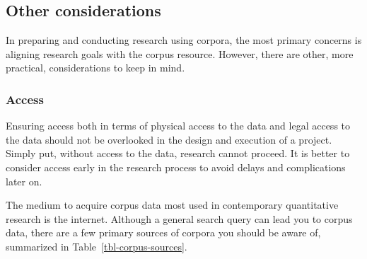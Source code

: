 \documentclass[
  letterpaper,
  DIV=11,
  numbers=noendperiod]{scrreprt}
\theoremstyle{definition}
\theoremstyle{remark}
\begin{document}
\subsection{Other considerations}\label{other-considerations}

In preparing and conducting research using corpora, the most primary
concerns is aligning research goals with the corpus resource. However,
there are other, more practical, considerations to keep in mind.

\subsubsection{Access}\label{access}

Ensuring access both in terms of physical access to the data and legal
access to the data should not be overlooked in the design and execution
of a project. Simply put, without access to the data, research cannot
proceed. It is better to consider access early in the research process
to avoid delays and complications later on.

The medium to acquire corpus data most used in contemporary quantitative
research is the internet. Although a general search query can lead you
to corpus data, there are a few primary sources of corpora you should be
aware of, summarized in Table~\ref{tbl-corpus-sources}.
\end{document}
